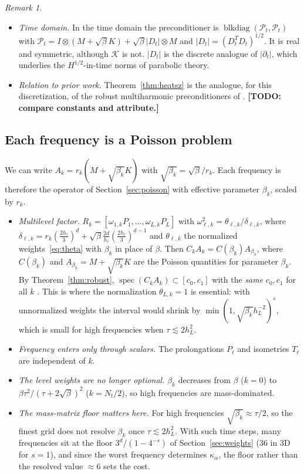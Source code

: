 \documentclass[11pt,a4paper]{article}
\newcommand{\todo}[1]{\textbf{[TODO: #1]}}
\theoremstyle{remark}
\newtheorem{remark}[theorem]{Remark}
\begin{document}
\begin{remark}
\begin{itemize}
\item \emph{Time domain.} In the time domain the preconditioner is
  $\operatorname{blkdiag}(\mathcal P_t,\mathcal P_t)$ with
  $\mathcal P_t=I\otimes(M+\sqrt\beta K)+\sqrt\beta|D_t|\otimes M$ and $|D_t|=(D_t^TD_t)^{1/2}$.
  It is real and symmetric, although $\mathcal K$ is not. $|D_t|$ is the
  discrete analogue of $|\partial_t|$, which underlies the $H^{1/2}$-in-time
  norms of parabolic theory.
\item \emph{Relation to prior work.} Theorem~\ref{thm:heatsz} is the
  analogue, for this discretization, of the robust multiharmonic
  preconditioners of \cite{KK12,KKLWZ13}. \todo{compare constants and
  attribute.}
\end{itemize}
\end{remark}

\subsection{Each frequency is a Poisson problem}

We can write $A_k=r_k(M+\sqrt{\beta_k}K)$ with $\sqrt{\beta_k}=\sqrt\beta/r_k$. Each
frequency is therefore the operator of Section~\ref{sec:poisson} with
effective parameter $\beta_k$, scaled by $r_k$.
\begin{itemize}
\item \emph{Multilevel factor.} $R_k=[\omega_{1,k}P_1,\dots,\omega_{L,k}P_L]$ with
  $\omega_{\ell,k}^2=\theta_{\ell,k}/\delta_{\ell,k}$, where
  $\delta_{\ell,k}=r_k(\frac{2h_\ell}3)^d+\sqrt\beta\frac{2d}{h_\ell}(\frac{2h_\ell}3)^{d-1}$ and
  $\theta_{\ell,k}$ the normalized weights~\eqref{eq:theta} with $\beta_k$ in place
  of $\beta$. Then $C_kA_k=C(\beta_k)A_{\beta_k}$, where $C(\beta_k)$ and
  $A_{\beta_k}=M+\sqrt{\beta_k}K$ are the Poisson quantities for parameter $\beta_k$.
  By Theorem~\ref{thm:robust}, $\operatorname{spec}(C_kA_k)\subset[c_0,c_1]$ with the
  \emph{same} $c_0,c_1$ for all $k$ \cite{SuppProof}. This is where the
  normalization $\theta_{L,k}=1$ is essential: with unnormalized weights the
  interval would shrink by $\min(1,\sqrt{\beta_k}h_L^{-2})^s$, which is small for
  high frequencies when $\tau\lesssim2h_L^2$.
\item \emph{Frequency enters only through scalars.} The prolongations $P_\ell$
  and isometries $T_\ell$ are independent of $k$.
\item \emph{The level weights are no longer optional.} $\beta_k$ decreases from
  $\beta$ ($k=0$) to $\beta\tau^2/(\tau+2\sqrt\beta)^2$ ($k=N_t/2$), so high frequencies
  are mass-dominated.
\item \emph{The mass-matrix floor matters here.} For high frequencies
  $\sqrt{\beta_k}\approx\tau/2$, so the finest grid does not resolve $\beta_k$ once
  $\tau\lesssim2h_L^2$. With such time steps, many frequencies sit at the floor
  $3^d/(1-4^{-s})$ of Section~\ref{sec:weights} (36 in 3D for $s=1$), and since
  the worst frequency determines $\kappa_\alpha$, the floor rather than the
  resolved value $\approx6$ sets the cost.
\end{itemize}
\end{document}
